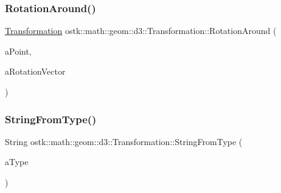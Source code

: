 \subsubsection{\texorpdfstring{Rotation\+Around()}{RotationAround()}}
{\footnotesize\ttfamily \hyperlink{classostk_1_1math_1_1geom_1_1d3_1_1_transformation}{Transformation} ostk\+::math\+::geom\+::d3\+::\+Transformation\+::\+Rotation\+Around (\begin{DoxyParamCaption}\item[{const \hyperlink{classostk_1_1math_1_1geom_1_1d3_1_1objects_1_1_point}{Point} \&}]{a\+Point,  }\item[{const \hyperlink{classostk_1_1math_1_1geom_1_1d3_1_1trf_1_1rot_1_1_rotation_vector}{Rotation\+Vector} \&}]{a\+Rotation\+Vector }\end{DoxyParamCaption})\hspace{0.3cm}{\ttfamily [static]}}

\mbox{\label{classostk_1_1math_1_1geom_1_1d3_1_1_transformation_a69b2048fd161c6ea3a641acbd638325b}} 
\subsubsection{\texorpdfstring{String\+From\+Type()}{StringFromType()}}
{\footnotesize\ttfamily String ostk\+::math\+::geom\+::d3\+::\+Transformation\+::\+String\+From\+Type (\begin{DoxyParamCaption}\item[{const \hyperlink{classostk_1_1math_1_1geom_1_1d3_1_1_transformation_a04794da018108a1e973dad364c32b4ec}{Transformation\+::\+Type} \&}]{a\+Type }\end{DoxyParamCaption})\hspace{0.3cm}{\ttfamily [static]}}

\mbox{\label{classostk_1_1math_1_1geom_1_1d3_1_1_transformation_a66013ed0dfecce2f0931bab9ce3235f8}} 
